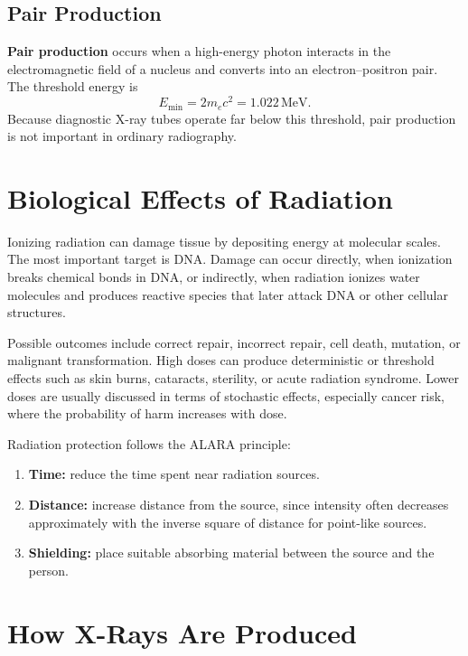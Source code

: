 \documentclass[12pt]{article}
\begin{document}
\subsection{Pair Production}

\textbf{Pair production} occurs when a high-energy photon interacts in the electromagnetic field of a nucleus and converts into an electron--positron pair. The threshold energy is
\begin{equation}
    E_{\min} = 2m_e c^2 = 1.022\,\mathrm{MeV}.
\end{equation}
Because diagnostic X-ray tubes operate far below this threshold, pair production is not important in ordinary radiography.

\section{Biological Effects of Radiation}

Ionizing radiation can damage tissue by depositing energy at molecular scales. The most important target is DNA. Damage can occur directly, when ionization breaks chemical bonds in DNA, or indirectly, when radiation ionizes water molecules and produces reactive species that later attack DNA or other cellular structures.

Possible outcomes include correct repair, incorrect repair, cell death, mutation, or malignant transformation. High doses can produce deterministic or threshold effects such as skin burns, cataracts, sterility, or acute radiation syndrome. Lower doses are usually discussed in terms of stochastic effects, especially cancer risk, where the probability of harm increases with dose.

Radiation protection follows the ALARA principle:
\begin{enumerate}[label=\arabic*.]
    \item \textbf{Time:} reduce the time spent near radiation sources.
    \item \textbf{Distance:} increase distance from the source, since intensity often decreases approximately with the inverse square of distance for point-like sources.
    \item \textbf{Shielding:} place suitable absorbing material between the source and the person.
\end{enumerate}

\section{How X-Rays Are Produced}
\end{document}

